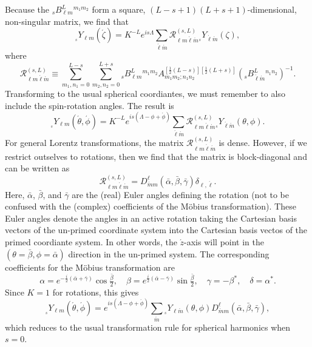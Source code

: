\documentclass[11pt]{article}
\newcommand{\swY}[4][]{{}_{{}_{#2}}\!Y^{#1}_{#3}(#4)}
\begin{document}
Because the ${}_sB^L_{\ell m}{}^{m_1m_2}$ form a square,
$(L-s+1)(L+s+1)$-dimensional, non-singular matrix, we find that
\begin{equation}
\swY{s}{\ell m}{\acute\zeta}=K^{-L}e^{is\Lambda}\sum_{\acute\ell\acute{m}}
         \mathcal{R}^{(s,L)}_{\ell m\acute\ell\acute{m}}
         \swY{s}{\acute\ell\acute{m}}{\zeta},
\end{equation}
where
\begin{equation}
  \mathcal{R}^{(s,L)}_{\ell m\acute\ell\acute{m}}\equiv
    \sum_{m_1,n_1=0}^{L-s} \sum_{m_2,n_2=0}^{L+s}
         {}_sB^L_{\ell m}{}^{m_1m_2}
         A^{[\frac12(L-s)][\frac12(L+s)]}_{m_1m_2;n_1n_2}
         \left( {}_sB^L_{\acute\ell\acute{m}}{}^{n_1n_2}\right)^{-1}.
\end{equation}
Transforming to the usual spherical coordiantes, we must remember to also
include the spin-rotation angles.  The result is
\begin{equation}\label{eq:LorentzYTrans}
\swY{s}{\ell m}{\acute\theta,\acute\phi}=
     K^{-L}e^{is(\Lambda-\phi+\acute\phi)}\sum_{\acute\ell\acute{m}}
         \mathcal{R}^{(s,L)}_{\ell m\acute\ell\acute{m}}
                 \swY{s}{\acute\ell\acute{m}}{\theta,\phi}.
\end{equation}
For general Lorentz transformations, the matrix
$\mathcal{R}^{(s,L)}_{\ell m\acute\ell\acute{m}}$ is dense.  However,
if we restrict outselves to rotations, then we find that the matrix is
block-diagonal and can be written as
\begin{equation}
  \mathcal{R}^{(s,L)}_{\ell m\acute\ell\acute{m}} = 
  D^\ell_{\acute{m}m}(\bar\alpha,\bar\beta,\bar\gamma)\delta_{\ell,\acute\ell}.
\end{equation}
Here, $\bar\alpha$, $\bar\beta$, and $\bar\gamma$ are the (real) Euler
angles defining the rotation (not to be confused with the (complex)
coefficients of the M\"{o}bius transformation).  These Euler angles
denote the angles in an active rotation taking the Cartesian basis
vectors of the un-primed coordinate system into the Cartesian basis
vectos of the primed coordiante system.  In other words, the
$\acute{z}$-axis will point in the $(\theta=\bar\beta,\phi=\bar\alpha)$
direction in the un-primed system.  The corresponding coefficients for
the M\"{o}bius transformation are
\begin{equation}
  \alpha = e^{-\frac{i}2(\bar\alpha+\bar\gamma)}\cos\tfrac{\bar\beta}2,
\quad
  \beta = e^{\frac{i}2(\bar\alpha-\bar\gamma)}\sin\tfrac{\bar\beta}2,
\quad
  \gamma = -\beta^*,
\quad
  \delta = \alpha^*. 
\end{equation}
Since $K=1$ for
rotations, this gives
\begin{equation}
\swY{s}{\ell m}{\acute\theta,\acute\phi}=
     e^{is(\Lambda-\phi+\acute\phi)}\sum_{\acute{m}}
         \swY{s}{\ell\acute{m}}{\theta,\phi}
         D^\ell_{\acute{m}m}(\bar\alpha,\bar\beta,\bar\gamma),
\end{equation}
which reduces to the usual transformation rule for spherical harmonics
when $s=0$.
\end{document}
